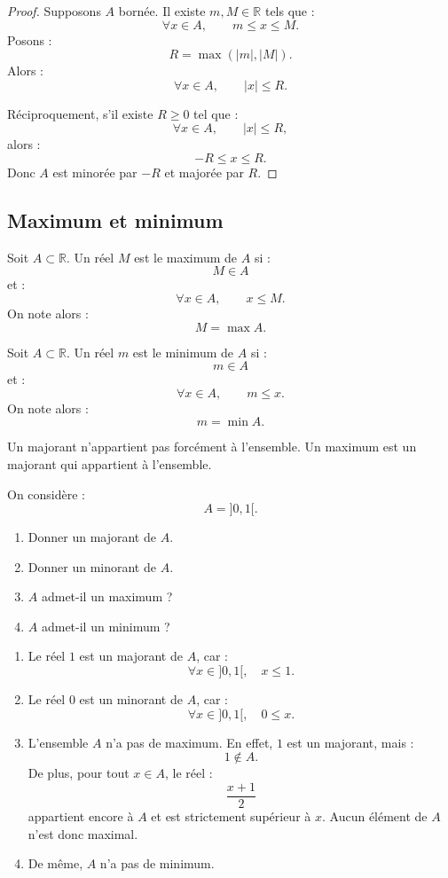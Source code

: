 \documentclass[11pt,a4paper]{article}
\newcommand{\R}{\mathbb R}
\newcommand{\abs}[1]{\left|#1\right|}
\begin{document}
\begin{proof}
Supposons \(A\) bornée.  
Il existe \(m,M\in\R\) tels que :
\[
\forall x\in A,\qquad m\leq x\leq M.
\]
Posons :
\[
R=\max(\abs{m},\abs{M}).
\]
Alors :
\[
\forall x\in A,\qquad \abs{x}\leq R.
\]

Réciproquement, s'il existe \(R\geq0\) tel que :
\[
\forall x\in A,\qquad \abs{x}\leq R,
\]
alors :
\[
-R\leq x\leq R.
\]
Donc \(A\) est minorée par \(-R\) et majorée par \(R\).
\end{proof}

\subsection{Maximum et minimum}

\begin{definitionbox}[Maximum]
Soit \(A\subset\R\).  
Un réel \(M\) est le maximum de \(A\) si :
\[
M\in A
\]
et :
\[
\forall x\in A,\qquad x\leq M.
\]
On note alors :
\[
M=\max A.
\]
\end{definitionbox}

\begin{definitionbox}[Minimum]
Soit \(A\subset\R\).  
Un réel \(m\) est le minimum de \(A\) si :
\[
m\in A
\]
et :
\[
\forall x\in A,\qquad m\leq x.
\]
On note alors :
\[
m=\min A.
\]
\end{definitionbox}

\begin{erreurbox}
Un majorant n'appartient pas forcément à l'ensemble.  
Un maximum est un majorant qui appartient à l'ensemble.
\end{erreurbox}

\begin{exercicebox}
On considère :
\[
A=]0,1[.
\]
\begin{enumerate}
    \item Donner un majorant de \(A\).
    \item Donner un minorant de \(A\).
    \item \(A\) admet-il un maximum ?
    \item \(A\) admet-il un minimum ?
\end{enumerate}
\end{exercicebox}

\begin{correctionbox}
\begin{enumerate}
    \item Le réel \(1\) est un majorant de \(A\), car :
    \[
    \forall x\in]0,1[,\quad x\leq1.
    \]
    \item Le réel \(0\) est un minorant de \(A\), car :
    \[
    \forall x\in]0,1[,\quad 0\leq x.
    \]
    \item L'ensemble \(A\) n'a pas de maximum. En effet, \(1\) est un majorant, mais :
    \[
    1\notin A.
    \]
    De plus, pour tout \(x\in A\), le réel :
    \[
    \frac{x+1}{2}
    \]
    appartient encore à \(A\) et est strictement supérieur à \(x\). Aucun élément de \(A\) n'est donc maximal.
    \item De même, \(A\) n'a pas de minimum.
\end{enumerate}
\end{correctionbox}
\end{document}

